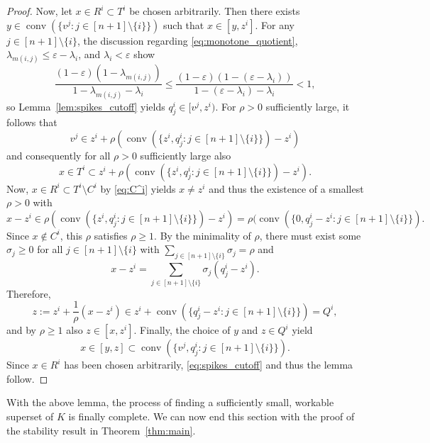 \documentclass{amsart}
\DeclareMathOperator{\conv}{conv}
\begin{document}
\begin{proof}
Now, let $x \in R^i \subset T^i$ be chosen arbitrarily.
Then there exists $y \in \conv(\{ v^j : j \in [n+1] \setminus \{i\} \})$ such that $x \in [y,z^i]$.
For any $j \in [n+1] \setminus \{i\}$,
the discussion regarding \eqref{eq:monotone_quotient}, $\lambda_{m(i,j)} \leq \varepsilon - \lambda_i$, and $\lambda_i < \varepsilon$ show
\[
	\frac{(1 - \varepsilon) (1 - \lambda_{m(i,j)})}{1 - \lambda_{m(i,j)} - \lambda_i}
	\leq \frac{(1 - \varepsilon) (1 - (\varepsilon - \lambda_i))}{1 - (\varepsilon - \lambda_i) - \lambda_i}
	< 1,
\]
so Lemma~\ref{lem:spikes_cutoff} yields $q^i_j \in [v^j,z^i)$.
For $\rho > 0$ sufficiently large, it follows that
\[
	v^j
    \in z^i + \rho (\conv(\{ z^i, q^i_j : j \in [n+1] \setminus \{i\} \}) - z^i)
\]
and consequently for all $\rho > 0$ sufficiently large also
\[
	x
	\in T^i
	\subset z^i + \rho (\conv(\{ z^i, q^i_j : j \in [n+1] \setminus \{i\} \}) - z^i).
\]
Now, $x \in R^i \subset T^i \setminus C^i$ by \eqref{eq:C^i} yields $x \neq z^i$ and thus the existence of a smallest $\rho > 0$ with
\[
	x - z^i
		\in \rho (\conv(\{ z^i, q^i_j : j \in [n+1] \setminus \{i\} \}) - z^i)
		= \rho (\conv(\{ 0, q^i_j - z^i : j \in [n+1] \setminus \{i\} \}).
\]
Since $x \notin C^i$, this $\rho$ satisfies $\rho \geq 1$.
By the minimality of $\rho$, there must exist some $\sigma_j \geq 0$ for all $j \in [n+1] \setminus \{i\}$ with
$\sum_{j \in [n+1] \setminus \{i\}} \sigma_j = \rho$ and
\[
	x - z^i
    = \sum_{j \in [n+1] \setminus \{i\}} \sigma_j (q^i_j - z^i).
\]
Therefore,
\[
	z
    := z^i + \frac{1}{\rho} (x - z^i)
	\in z^i + \conv(\{ q^i_j - z^i : j \in [n+1] \setminus \{i\} \})
	= Q^i,
\]
and by $\rho \geq 1$ also $z \in [x,z^i]$.
Finally, the choice of $y$ and $z \in Q^i$ yield
\[
	x
	\in [y,z]
	\subset \conv(\{ v^j, q^i_j : j \in [n+1] \setminus \{i\} \}).
\]
Since $x \in R^i$ has been chosen arbitrarily, \eqref{eq:spikes_cutoff} and thus the lemma follow.
\end{proof}



With the above lemma,
the process of finding a sufficiently small, workable superset of $K$ is finally complete.
We can now end this section with the proof of the stability result in Theorem~\ref{thm:main}.
\end{document}
